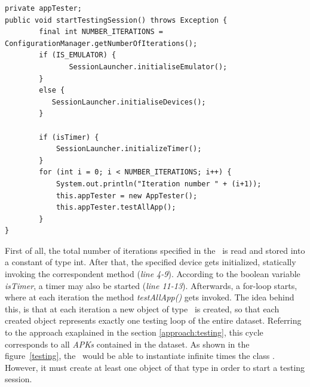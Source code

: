\begin{lstlisting}[caption=\SessionLauncher\ Code snippet for starting a testing session ,label={lst:startsession}]
private appTester; 
public void startTestingSession() throws Exception {
        final int NUMBER_ITERATIONS = ConfigurationManager.getNumberOfIterations();
        if (IS_EMULATOR) {
        	   SessionLauncher.initialiseEmulator();
        }
        else {
       	   SessionLauncher.initialiseDevices();
        }
       
        if (isTimer) {
            SessionLauncher.initializeTimer();
        }
        for (int i = 0; i < NUMBER_ITERATIONS; i++) {
            System.out.println("Iteration number " + (i+1));
            this.appTester = new AppTester();
            this.appTester.testAllApp();
        }
}
\end{lstlisting}
First of all, the total number of iterations specified in the \Config\ is read and stored into a constant of type int. After that, the specified device gets initialized, statically invoking the correspondent method (\textit{line 4-9}).  
According to the boolean variable \textit{isTimer}, a timer may also be started (\textit{line 11-13}).
Afterwards, a for-loop starts, where at each iteration the method \textit{testAllApp()} gets invoked. 
The idea behind this, is that at each iteration a new object of type \AppTester\ is created, so that each created object represents exactly one testing loop of the entire dataset. 
Referring to the approach exaplained in the section \ref{approach:testing}, this cycle corresponds to
all \textit{APKs} contained in the dataset. 
As shown in the figure~\ref{testing}, the \SessionLauncher\ would be able to instantiate infinite times the class \AppTester. However, it must create at least one object of that type in order to start a testing session. 

